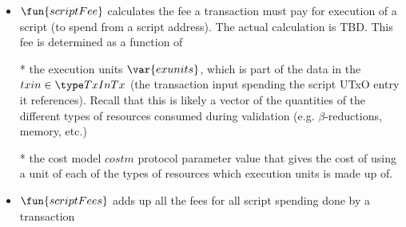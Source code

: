 \begin{itemize}
  \item $\fun{scriptFee}$ calculates the fee a transaction must pay
  for execution of a script (to spend from a script address).
  The actual calculation is TBD. This fee is determined as a function of

  * the execution units $\var{exunits}$, which is part of the data in
  the $txin \in \TxInTx$ (the transaction input spending the script
  UTxO entry it references). Recall that this is likely a vector of
  the quantities of the different types of resources consumed during
  validation (e.g. $\beta$-reductions, memory, etc.)

  * the cost model $costm$ protocol parameter value that gives the cost
  of using a unit of each of the types of resources which execution units is
  made up of.

  \item $\fun{scriptFees}$ adds up all the fees for all script spending
  done by a transaction
\end{itemize}

